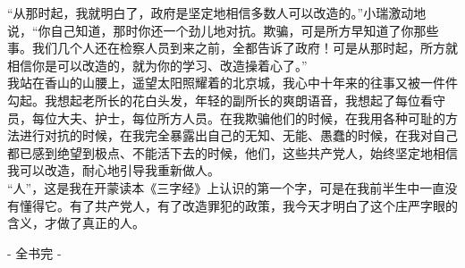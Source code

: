 “从那时起，我就明白了，政府是坚定地相信多数人可以改造的。”小瑞激动地说，“你自己知道，那时你还一个劲儿地对抗。欺骗，可是所方早知道了你那些事。我们几个人还在检察人员到来之前，全都告诉了政府！可是从那时起，所方就相信你是可以改造的，就为你的学习、改造操着心了。”\\

我站在香山的山腰上，遥望太阳照耀着的北京城，我心中十年来的往事又被一件件勾起。我想起老所长的花白头发，年轻的副所长的爽朗语音，我想起了每位看守员，每位大夫、护士，每位所方人员。在我欺骗他们的时候，在我用各种可耻的方法进行对抗的时候，在我完全暴露出自己的无知、无能、愚蠢的时候，在我对自己都已感到绝望到极点、不能活下去的时候，他们，这些共产党人，始终坚定地相信我可以改造，耐心地引导我重新做人。\\

“人”，这是我在开蒙读本《三字经》上认识的第一个字，可是在我前半生中一直没有懂得它。有了共产党人，有了改造罪犯的政策，我今天才明白了这个庄严字眼的含义，才做了真正的人。\\

\begin{center}
	- 全书完 -
\end{center}
